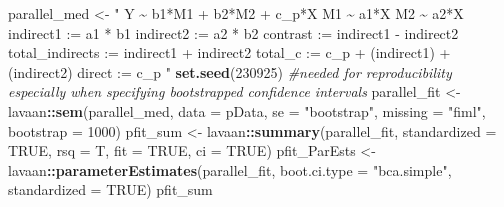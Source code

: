 \documentclass[
  11pt,
]{book}
\newenvironment{Shaded}{\begin{snugshade}}{\end{snugshade}}
\newcommand{\AttributeTok}[1]{\textcolor[rgb]{0.27,0.27,0.27}{#1}}
\newcommand{\CommentTok}[1]{\textcolor[rgb]{0.37,0.37,0.37}{\textit{#1}}}
\newcommand{\ConstantTok}[1]{\textcolor[rgb]{0.37,0.37,0.37}{#1}}
\newcommand{\DecValTok}[1]{\textcolor[rgb]{0.06,0.06,0.06}{#1}}
\newcommand{\FunctionTok}[1]{\textcolor[rgb]{0.27,0.27,0.27}{\textbf{#1}}}
\newcommand{\NormalTok}[1]{#1}
\newcommand{\OtherTok}[1]{\textcolor[rgb]{0.37,0.37,0.37}{#1}}
\newcommand{\SpecialCharTok}[1]{\textcolor[rgb]{0.43,0.43,0.43}{\textbf{#1}}}
\newcommand{\StringTok}[1]{\textcolor[rgb]{0.5,0.5,0.5}{#1}}
\begin{document}
\begin{Shaded}
\begin{Highlighting}[]
\NormalTok{parallel\_med }\OtherTok{\textless{}{-}} \StringTok{"}
\StringTok{    Y \textasciitilde{} b1*M1 + b2*M2 + c\_p*X}
\StringTok{    M1 \textasciitilde{} a1*X}
\StringTok{    M2 \textasciitilde{} a2*X}
\StringTok{    }
\StringTok{    indirect1 := a1 * b1}
\StringTok{    indirect2 := a2 * b2}
\StringTok{    contrast := indirect1 {-} indirect2}
\StringTok{    total\_indirects := indirect1 + indirect2}
\StringTok{    total\_c    := c\_p + (indirect1) + (indirect2)}
\StringTok{    direct := c\_p}
\StringTok{ "}
\FunctionTok{set.seed}\NormalTok{(}\DecValTok{230925}\NormalTok{)  }\CommentTok{\#needed for reproducibility especially when specifying bootstrapped confidence intervals}
\NormalTok{parallel\_fit }\OtherTok{\textless{}{-}}\NormalTok{ lavaan}\SpecialCharTok{::}\FunctionTok{sem}\NormalTok{(parallel\_med, }\AttributeTok{data =}\NormalTok{ pData, }\AttributeTok{se =} \StringTok{"bootstrap"}\NormalTok{,}
    \AttributeTok{missing =} \StringTok{"fiml"}\NormalTok{, }\AttributeTok{bootstrap =} \DecValTok{1000}\NormalTok{)}
\NormalTok{pfit\_sum }\OtherTok{\textless{}{-}}\NormalTok{ lavaan}\SpecialCharTok{::}\FunctionTok{summary}\NormalTok{(parallel\_fit, }\AttributeTok{standardized =} \ConstantTok{TRUE}\NormalTok{, }\AttributeTok{rsq =}\NormalTok{ T,}
    \AttributeTok{fit =} \ConstantTok{TRUE}\NormalTok{, }\AttributeTok{ci =} \ConstantTok{TRUE}\NormalTok{)}
\NormalTok{pfit\_ParEsts }\OtherTok{\textless{}{-}}\NormalTok{ lavaan}\SpecialCharTok{::}\FunctionTok{parameterEstimates}\NormalTok{(parallel\_fit, }\AttributeTok{boot.ci.type =} \StringTok{"bca.simple"}\NormalTok{,}
    \AttributeTok{standardized =} \ConstantTok{TRUE}\NormalTok{)}
\NormalTok{pfit\_sum}
\end{Highlighting}
\end{Shaded}
\end{document}

